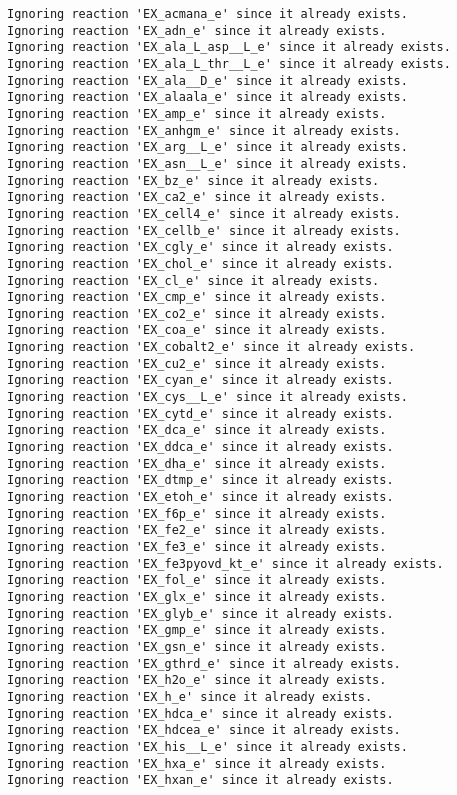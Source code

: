\documentclass[
  letterpaper,
  DIV=11,
  numbers=noendperiod]{scrartcl}
\begin{document}
\begin{verbatim}
Ignoring reaction 'EX_acmana_e' since it already exists.
Ignoring reaction 'EX_adn_e' since it already exists.
Ignoring reaction 'EX_ala_L_asp__L_e' since it already exists.
Ignoring reaction 'EX_ala_L_thr__L_e' since it already exists.
Ignoring reaction 'EX_ala__D_e' since it already exists.
Ignoring reaction 'EX_alaala_e' since it already exists.
Ignoring reaction 'EX_amp_e' since it already exists.
Ignoring reaction 'EX_anhgm_e' since it already exists.
Ignoring reaction 'EX_arg__L_e' since it already exists.
Ignoring reaction 'EX_asn__L_e' since it already exists.
Ignoring reaction 'EX_bz_e' since it already exists.
Ignoring reaction 'EX_ca2_e' since it already exists.
Ignoring reaction 'EX_cell4_e' since it already exists.
Ignoring reaction 'EX_cellb_e' since it already exists.
Ignoring reaction 'EX_cgly_e' since it already exists.
Ignoring reaction 'EX_chol_e' since it already exists.
Ignoring reaction 'EX_cl_e' since it already exists.
Ignoring reaction 'EX_cmp_e' since it already exists.
Ignoring reaction 'EX_co2_e' since it already exists.
Ignoring reaction 'EX_coa_e' since it already exists.
Ignoring reaction 'EX_cobalt2_e' since it already exists.
Ignoring reaction 'EX_cu2_e' since it already exists.
Ignoring reaction 'EX_cyan_e' since it already exists.
Ignoring reaction 'EX_cys__L_e' since it already exists.
Ignoring reaction 'EX_cytd_e' since it already exists.
Ignoring reaction 'EX_dca_e' since it already exists.
Ignoring reaction 'EX_ddca_e' since it already exists.
Ignoring reaction 'EX_dha_e' since it already exists.
Ignoring reaction 'EX_dtmp_e' since it already exists.
Ignoring reaction 'EX_etoh_e' since it already exists.
Ignoring reaction 'EX_f6p_e' since it already exists.
Ignoring reaction 'EX_fe2_e' since it already exists.
Ignoring reaction 'EX_fe3_e' since it already exists.
Ignoring reaction 'EX_fe3pyovd_kt_e' since it already exists.
Ignoring reaction 'EX_fol_e' since it already exists.
Ignoring reaction 'EX_glx_e' since it already exists.
Ignoring reaction 'EX_glyb_e' since it already exists.
Ignoring reaction 'EX_gmp_e' since it already exists.
Ignoring reaction 'EX_gsn_e' since it already exists.
Ignoring reaction 'EX_gthrd_e' since it already exists.
Ignoring reaction 'EX_h2o_e' since it already exists.
Ignoring reaction 'EX_h_e' since it already exists.
Ignoring reaction 'EX_hdca_e' since it already exists.
Ignoring reaction 'EX_hdcea_e' since it already exists.
Ignoring reaction 'EX_his__L_e' since it already exists.
Ignoring reaction 'EX_hxa_e' since it already exists.
Ignoring reaction 'EX_hxan_e' since it already exists.

\end{verbatim}
\end{document}
